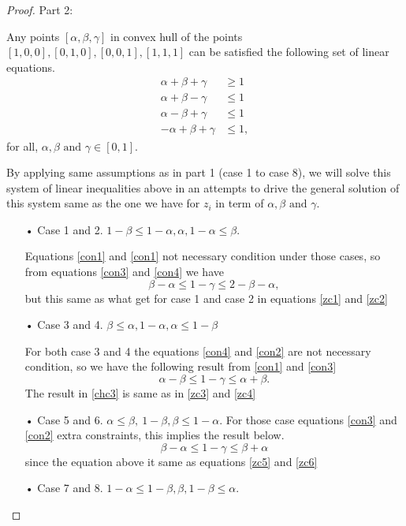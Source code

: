 \begin{proof}
Part 2:

Any points $[\alpha,\beta,\gamma]$ in convex hull of the points $[1, 0, 0], [0, 1, 0], [0, 0, 1], [1, 1, 1]$ can be satisfied the following set of linear equations.
\begin{align}
\alpha+\beta+\gamma &\geq 1\label{con1}\\
\alpha+\beta-\gamma &\leq 1\label{con2}\\
\alpha-\beta+\gamma &\leq 1\label{con3}\\
-\alpha+\beta+\gamma &\leq 1\label{con4},
\end{align}
for all, $ \alpha, \beta \text{ and }\gamma \in [0,1]$.

By applying same assumptions as in part 1 (case 1 to case 8), we will solve this system of linear  inequalities above in an attempts to drive the general solution of this system same as the one we have for $z_i$ in term of $ \alpha, \beta \text{ and }\gamma$.
\begin{itemize}
\item[• Case 1 and  2.] $1-\beta \leq 1-\alpha,\alpha ,1-\alpha \leq \beta$.

Equations \ref{con1} and \ref{con1} not necessary condition under those cases, so from equations \ref{con3} and \ref{con4} we have
\begin{equation}
\beta-\alpha \leq 1-\gamma \leq 2-\beta-\alpha, 
\end{equation}
but this same as what get for case 1 and case 2 in equations \ref{zc1} and \ref{zc2}
\item[• Case 3  and 4.] $\beta \leq \alpha,1-\alpha ,\alpha\leq 1-\beta$

For both case 3 and 4 the equations \ref{con4} and \ref{con2} are not necessary condition, so we have the following result from \ref{con1} and \ref{con3} 
\begin{equation}\label{chc3}
\alpha-\beta \leq 1-\gamma \leq \alpha+\beta.
\end{equation}
The result in \ref{chc3} is same as in \ref{zc3} and \ref{zc4}

\item[• Case 5 and 6.] $\alpha\leq \beta,\ 1-\beta ,\beta\leq 1-\alpha$.
For those case equations \ref{con3} and \ref{con2} extra constraints, this implies the result below.
\begin{equation}
\beta -\alpha \leq 1-\gamma\leq \beta +\alpha
\end{equation}
since the equation above it same as equations \ref{zc5} and \ref{zc6}
\item[• Case 7 and 8.] $1-\alpha \leq 1-\beta,\beta ,1-\beta \leq \alpha$.


\end{itemize}
\end{proof}

